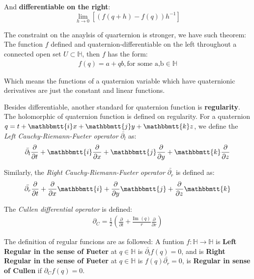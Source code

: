 \documentclass[]{ctexart}
\newcommand{\mi}{\mathbbmtt{i}}
\newcommand{\mj}{\mathbbmtt{j}}
\newcommand{\mk}{\mathbbmtt{k}}
\newcommand{\pa}{\partial}
\begin{document}
		And \textbf{differentiable on the right}:
			\begin{equation*}
				\lim_{h\rightarrow 0}[(f(q+h)-f(q))h^{-1}]
			\end{equation*}
			
		The constraint on the anaylsis of quarternion is stronger, we have such theorem: The function $f$ defined and quaternion-differentiable on the left throughout a connected open set $U\subset \mathbb{H}$, then $f$ has the form:
			\begin{equation*}
			\begin{aligned}
				f(q)=a+qb,\text{for some a,b}\in\mathbb{H}
			\end{aligned}
			\end{equation*}
			
		Which means the functions of a quaternion variable which have quaternionic derivatives are just the constant and linear functions. 
		
		Besides differentiable, another standard for quaternion function is \textbf{regularity}. The holomorphic of quaternion function is defined on regularity. For a quaternion $q=t+\mi x+\mj y+\mk z$, we define the \textit{Left Cauchy-Riemann-Fueter operator} $\bar{\pa_l}$ as:
			\begin{equation*}
			\begin{aligned}
				\bar{\pa_l}\frac{\pa }{\pa t}+\mi \frac{\pa }{\pa x}+\mj \frac{\pa }{\pa y}+\mk \frac{\pa }{\pa z}
			\end{aligned}
			\end{equation*}
			
		Similarly,  the \textit{Right Cauchy-Riemann-Fueter operator} $\bar{\pa_r}$ is defined as:
			\begin{equation*}
			\begin{aligned}
				\bar{\pa_r}\frac{\pa }{\pa t}+\frac{\pa }{\pa x}\mi +\frac{\pa }{\pa y}\mj + \frac{\pa }{\pa z}\mk
			\end{aligned}
			\end{equation*}
		
		The \textit{Cullen differential operator} is defined:
			\begin{equation*}
			\begin{aligned}
				\pa_C=\frac{1}{2}\left(\frac{\pa }{\pa t}+\frac{\text{Im }(q)}{r}\frac{\pa }{\pa r}\right)
			\end{aligned}
			\end{equation*}
			
		The definition of regular funcions are as followed: A funtion $f:\mathbb{H}\rightarrow \mathbb{H}$ is \textbf{Left Regular in the sense of Fueter} at $q\in \mathbb{H}$ is $\bar{\pa_l}f(q)=0$, and is \textbf{Right Regular in the sense of Fueter} at $q\in \mathbb{H}$ is $f(q)\bar{\pa_r}=0$, is \textbf{Regular in sense of Cullen} if $\pa_Cf(q)=0$. 
		
\end{document}

